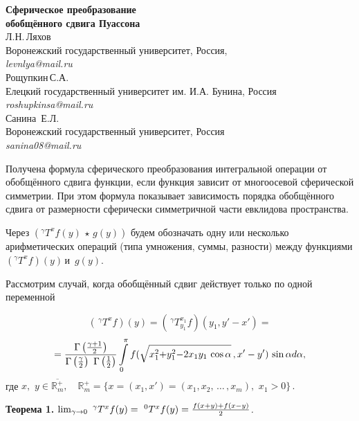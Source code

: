\begin{center}
{\bf Сферическое преобразование \\ обобщённого сдвига  Пуассона }\\
Л.Н.\,Ляхов \\
Воронежский государственный университет, Россия, \\
{\it levnlya@mail.ru} \\
Рощупкин\,С.А. \\
Елецкий государственный университет им. И.А. Бунина, Россия \\
 {\it roshupkinsa@mail.ru}\\
 Санина \,Е.Л. \\
Воронежский государственный университет, Россия \\
{\it sanina08@mail.ru}
\end{center}

Получена формула сферического преобразования интегральной операции от обобщённого сдвига функции, если функция зависит от многоосевой сферической симметрии. При этом формула показывает зависимость порядка обобщённого сдвига от размерности сферически симметричной части евклидова пространства.%

	Через
	$
	\left(^\gamma T^xf(y)\,\star\,g(y)\right)
	$
	будем обозначать одну или несколько арифметических операций (типа умножения, суммы, разности) между функциями $\left(^\gamma T^xf\right)(y)$\,и \,$g(y)$.

	 Рассмотрим случай, когда обобщённый сдвиг действует только по одной переменной

$$
(\,^\gamma T^{x}f)(y){=}(\,^\gamma T_{y_1}^{x_1}f)(y_1,y'{-}x')=$$
$$
=\frac{\Gamma\left(\gamma+1\over2\right)}{\Gamma\left(\frac{\gamma}{2}\right)\,\,\Gamma\left(\frac{1}{2}\right)}\int\limits_0^\pi
f(\sqrt{x_1^2{+}y^2_1{-}2x_1y_1\,\cos\alpha}\,,x'-y')\,\sin\alpha
d\alpha,
$$
где $x,\,\,y\in\overline{\mathbb{R}^+_m},\quad	\mathbb{R}^+_m{=}\{x{=}(x_1,x'){=}(x_1,x_2,\,\ldots\,,x_m),\,\,x_1>0\}\,.$

	{\bf Теорема 1.}  {\it $\lim_{\gamma\to0}\,\,^\gamma T^x f(y)=\,\,^0T^x f(y)={f(x+y)+f(x-y)\over2}$.}

